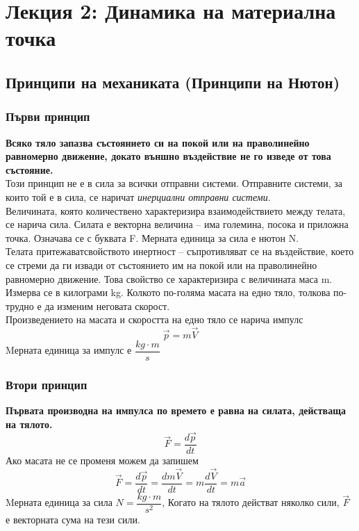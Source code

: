 \documentclass[fleqn, 12pt]{article}
\theoremstyle{definition}
\begin{document}
\newpage

\section{Лекция 2: Динамика на материална точка}

\subsection{Принципи на механиката (Принципи на Нютон)}
 
\subsubsection{Първи принцип}

\textbf{Всяко тяло запазва състоянието си на покой или на праволинейно равномерно движение, докато външно въздействие не го изведе от това състояние.}\\
Този принцип не е в сила за всички отправни системи. Отправните системи, за които той е в сила, се наричат \textit{инерциални отправни системи}. \\
Величината, която количествено характеризира взаимодействието между телата, се нарича сила. Силата е векторна величина – има големина, посока и приложна точка. Означава се с буквата F. Мерната единица за сила е нютон N.\\
Телата притежаватсвойството инертност – съпротивляват се на въздействие, което се стреми да ги извади от състоянието им на покой или на праволинейно равномерно движение. Това свойство се характеризира с величината маса m. Измерва се в килограми kg. Колкото по-голяма масата на едно тяло, толкова по-трудно е да изменим неговата скорост. \\
Произведението на масата и скоростта на едно тяло се нарича импулс $$\vec{p} = m \vec{V}$$
Mерната единица за импулс е  $ \dfrac{kg \cdot m}{s} $

\subsubsection{Втори принцип}
\textbf{Първата производна на импулса по времето е равна на силата, действаща на тялото.}
$$\vec{F} = \dfrac{d \vec{p}}{dt}$$
Ако масата не се променя можем да запишем
$$\vec{F} = \dfrac{d \vec{p}}{dt} = \dfrac{d m\vec{V}}{dt} = m \dfrac{d\vec{V}}{dt} = m \vec{a}$$
Mерната единица за сила $N = \dfrac{kg \cdot m}{s^2}$, Когато на тялото
действат няколко сили, $\vec{F}$ е векторната сума на тези сили.
\end{document}
